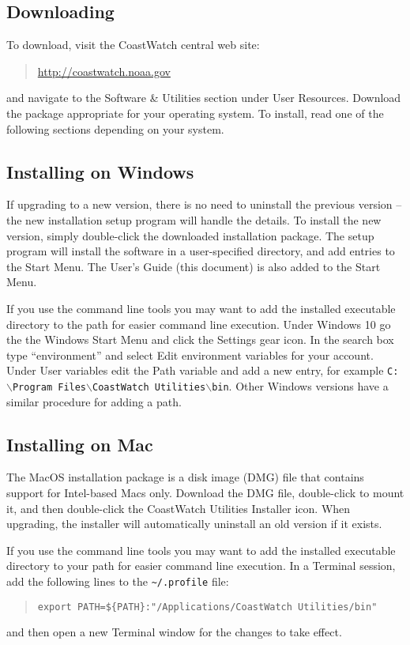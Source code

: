 \subsection{Downloading}

To download, visit the CoastWatch central web site: 
\begin{quote}
  \url{http://coastwatch.noaa.gov}
\end{quote}
and navigate to the {\gui Software \& Utilities} section under
{\gui User Resources}.  Download the package appropriate for your
operating system. To install, read one of the following sections
depending on your system.

\subsection{Installing on Windows}

If upgrading to a new version, there is no need to uninstall the
previous version -- the new installation setup program will handle
the details.  To install the new version, simply double-click the
downloaded installation package. The setup program will install the
software in a user-specified directory, and add entries to the Start
Menu.  The User's Guide (this document) is also added to the Start
Menu.

If you use the command line tools you may want to add the installed
executable directory to the path for easier command line execution.  Under
Windows 10 go the the Windows {\gui Start Menu} and click the
{\gui Settings} gear icon.  In the search box type ``environment'' and select
{\gui Edit environment variables for your account}.  Under {\gui User variables}
edit the {\gui Path} variable and add a new entry, for example
{\tt C:$\backslash$Program Files$\backslash$CoastWatch Utilities$\backslash$bin}.
Other Windows versions have a similar procedure for adding a path.

\subsection{Installing on Mac}

The MacOS installation package is a disk image (DMG) file that
contains support for Intel-based Macs only.  Download the DMG file,
double-click to mount it, and then
double-click the {\gui CoastWatch Utilities Installer} icon.
When upgrading, the installer will automatically uninstall an old version if
it exists.

If you use the command line tools you may want to add the installed
executable directory to your path for easier command line execution.
In a Terminal session, add the following lines to the {\tt \~{ }/.profile}
file:
\begin{quote}
  {\tt export PATH=\$\{PATH\}:"/Applications/CoastWatch Utilities/bin"}
\end{quote}
and then open a new Terminal window for the changes to take effect.

